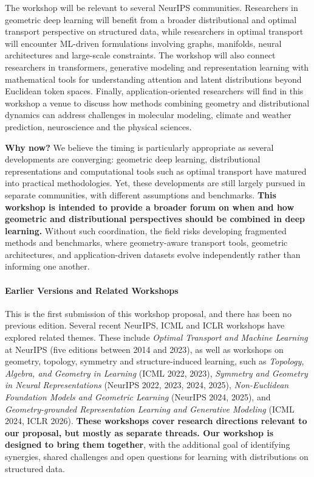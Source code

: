 \documentclass{article}
\begin{document}
The workshop will be relevant to several NeurIPS communities. Researchers in geometric deep learning will benefit from a broader distributional and optimal transport perspective on structured data, while researchers in optimal transport will encounter ML-driven formulations involving graphs, manifolds, neural architectures and large-scale constraints. The workshop will also connect researchers in transformers, generative modeling and representation learning with mathematical tools for understanding attention and latent distributions beyond Euclidean token spaces. Finally, application-oriented researchers will find in this workshop a venue to discuss how methods combining geometry and distributional dynamics can address challenges in molecular modeling, climate and weather prediction, neuroscience and the physical sciences.

\textbf{Why now?} We believe the timing is particularly appropriate as several developments are converging: geometric deep learning, distributional representations and computational tools such as optimal transport have matured into practical methodologies. Yet, these developments are still largely pursued in separate communities, with different assumptions and benchmarks. \textbf{This workshop is intended to provide a broader forum on when and how geometric and distributional perspectives should be combined in deep learning.} Without such coordination, the field risks developing fragmented methods and benchmarks, where geometry-aware transport tools, geometric architectures, and application-driven datasets evolve independently rather than informing one another.

\paragraph{Earlier Versions and Related Workshops} This is the first submission of this workshop proposal, and there has been no previous edition. Several recent NeurIPS, ICML and ICLR workshops have explored related themes. These include \emph{Optimal Transport and Machine Learning} at NeurIPS (five editions between 2014 and 2023), as well as workshops on geometry, topology, symmetry and structure-induced learning, such as \emph{Topology, Algebra, and Geometry in Learning} (ICML 2022, 2023), \emph{Symmetry and Geometry in Neural Representations} (NeurIPS 2022, 2023, 2024, 2025), \emph{Non-Euclidean Foundation Models and Geometric Learning} (NeurIPS 2024, 2025), and \emph{Geometry-grounded Representation Learning and Generative Modeling} (ICML 2024, ICLR 2026). \textbf{These workshops cover research directions relevant to our proposal, but mostly as separate threads. Our workshop is designed to bring them together}, with the additional goal of identifying synergies, shared challenges and open questions for learning with distributions on structured data.
\end{document}
